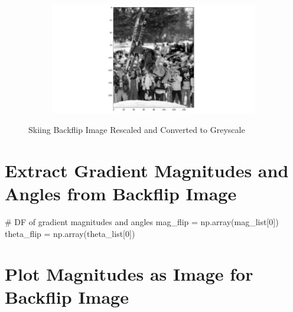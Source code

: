 \documentclass[
  letterpaper,
  DIV=11,
  numbers=noendperiod]{scrreprt}
\newenvironment{Shaded}{\begin{snugshade}}{\end{snugshade}}
\newcommand{\CommentTok}[1]{\textcolor[rgb]{0.37,0.37,0.37}{#1}}
\newcommand{\DecValTok}[1]{\textcolor[rgb]{0.68,0.00,0.00}{#1}}
\newcommand{\NormalTok}[1]{\textcolor[rgb]{0.00,0.23,0.31}{#1}}
\newcommand{\OperatorTok}[1]{\textcolor[rgb]{0.37,0.37,0.37}{#1}}
\begin{document}
\begin{figure}

\begin{minipage}{\linewidth}

\begin{figure}[H]

{\centering \includegraphics{images/plots/backflip/0.jpg}

}


\end{figure}%

\end{minipage}%

\caption{\label{fig-flip}Skiing Backflip Image Rescaled and Converted to
Greyscale}

\end{figure}%

\section{Extract Gradient Magnitudes and Angles from Backflip
Image}\label{extract-gradient-magnitudes-and-angles-from-backflip-image}

\begin{Shaded}
\begin{Highlighting}[]
\CommentTok{\# DF of gradient magnitudes and angles}
\NormalTok{mag\_flip }\OperatorTok{=}\NormalTok{ np.array(mag\_list[}\DecValTok{0}\NormalTok{])}
\NormalTok{theta\_flip }\OperatorTok{=}\NormalTok{ np.array(theta\_list[}\DecValTok{0}\NormalTok{])}
\end{Highlighting}
\end{Shaded}

\section{Plot Magnitudes as Image for Backflip
Image}\label{plot-magnitudes-as-image-for-backflip-image}
\end{document}
